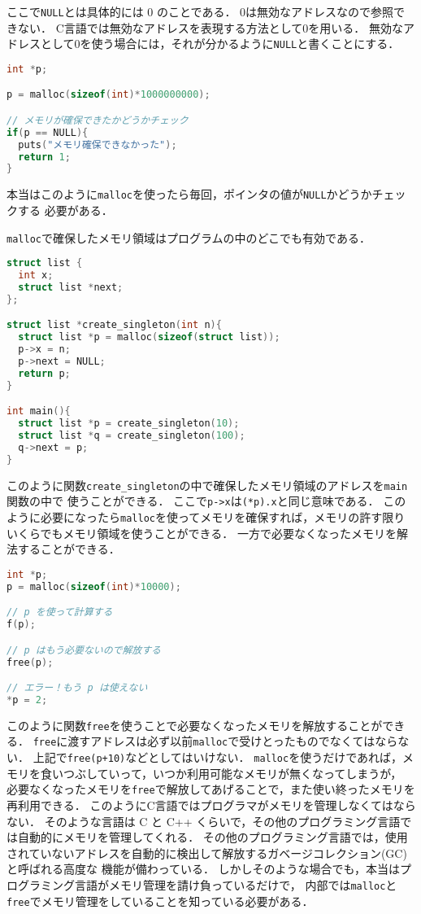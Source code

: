 \documentclass[a4paper,twoside,onecolumn,openany,article]{memoir}
\theoremstyle{remark}
\begin{document}
ここで\texttt{NULL}とは具体的には 0 のことである．
0は無効なアドレスなので参照できない．
C言語では無効なアドレスを表現する方法として0を用いる．
無効なアドレスとして0を使う場合には，それが分かるように\texttt{NULL}と書くことにする．
\begin{lstlisting}[basicstyle=\ttfamily\small,showstringspaces=false,language=C,frame=single]
int *p;

p = malloc(sizeof(int)*1000000000);

// メモリが確保できたかどうかチェック
if(p == NULL){
  puts("メモリ確保できなかった");
  return 1;
}

\end{lstlisting}
本当はこのように\texttt{malloc}を使ったら毎回，ポインタの値が\texttt{NULL}かどうかチェックする
必要がある．

\texttt{malloc}で確保したメモリ領域はプログラムの中のどこでも有効である．

\begin{lstlisting}[basicstyle=\ttfamily\small,showstringspaces=false,language=C,frame=single]
struct list {
  int x;
  struct list *next;
};

struct list *create_singleton(int n){
  struct list *p = malloc(sizeof(struct list));
  p->x = n;
  p->next = NULL;
  return p;
}

int main(){
  struct list *p = create_singleton(10);
  struct list *q = create_singleton(100);
  q->next = p;
}
\end{lstlisting}
このように関数\texttt{create\_singleton}の中で確保したメモリ領域のアドレスを\texttt{main}関数の中で
使うことができる．
ここで\texttt{p->x}は\texttt{(*p).x}と同じ意味である．
このように必要になったら\texttt{malloc}を使ってメモリを確保すれば，メモリの許す限りいくらでもメモリ領域を使うことができる．
一方で必要なくなったメモリを解法することができる．

\begin{lstlisting}[basicstyle=\ttfamily\small,showstringspaces=false,language=C,frame=single]
int *p;
p = malloc(sizeof(int)*10000);

// p を使って計算する
f(p);

// p はもう必要ないので解放する
free(p);

// エラー！もう p は使えない
*p = 2;
\end{lstlisting}
このように関数\texttt{free}を使うことで必要なくなったメモリを解放することができる．
\texttt{free}に渡すアドレスは必ず以前\texttt{malloc}で受けとったものでなくてはならない．
上記で\texttt{free(p+10)}などとしてはいけない．
\texttt{malloc}を使うだけであれば，メモリを食いつぶしていって，いつか利用可能なメモリが無くなってしまうが，
必要なくなったメモリを\texttt{free}で解放してあげることで，また使い終ったメモリを再利用できる．
このようにC言語ではプログラマがメモリを管理しなくてはならない．
そのような言語は C と C++ くらいで，その他のプログラミング言語では自動的にメモリを管理してくれる．
その他のプログラミング言語では，使用されていないアドレスを自動的に検出して解放するガベージコレクション(GC)と呼ばれる高度な
機能が備わっている．
しかしそのような場合でも，本当はプログラミング言語がメモリ管理を請け負っているだけで，
内部では\texttt{malloc}と\texttt{free}でメモリ管理をしていることを知っている必要がある．
\end{document}
